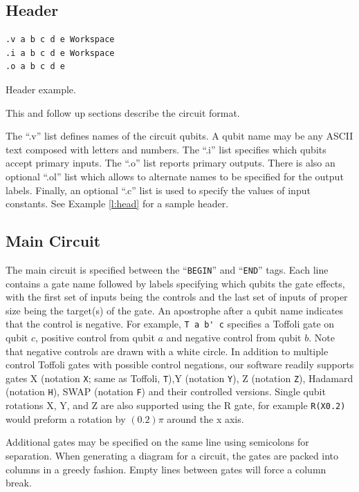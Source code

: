 \documentclass[aps,prl,reprint,floatfix,superscriptaddress]{revtex4-1} %
\begin{document}
\subsection{Header}
\begin{program}
\begin{verbatim}
.v a b c d e Workspace
.i a b c d e Workspace
.o a b c d e
\end{verbatim}
\caption{Header example.}
\label{l:head}
\end{program}
This and follow up sections describe the circuit format. 

The ``.v'' list defines names of the circuit qubits. A qubit name may be any ASCII text composed with letters and numbers. The ``.i'' list specifies which %
qubits accept primary inputs.
The ``.o'' list reports primary outputs.
There is also an optional ``.ol'' list which allows to alternate names to be specified for the output labels. Finally, an optional ``.c'' list is used to %
specify the values of input constants. See Example \ref{l:head} for a sample header.

\subsection{Main Circuit}
The main circuit is specified between the ``\verb+BEGIN+'' and ``\verb+END+'' tags.  Each line contains a gate name followed by labels
specifying which qubits the gate effects, with the first set of inputs being the controls
and the last set of inputs of proper size being the target(s) of the gate.
An apostrophe after a qubit name indicates that the control is negative. For example, \verb+T a b' c+ specifies a Toffoli gate on
qubit $c$, positive control from qubit $a$ and negative control from qubit $b$. Note that negative controls are drawn with a white circle.
In addition to multiple control Toffoli gates with possible control negations, our software readily supports gates X 
(notation \verb+X+; same as Toffoli, \verb+T+),Y (notation \verb+Y+), Z (notation \verb+Z+), Hadamard (notation \verb+H+), 
SWAP (notation \verb+F+) and their controlled versions. 
Single qubit rotations X, Y, and Z are also supported using the R gate, for example 
\verb+R(X0.2)+ would preform a rotation by $(0.2)\pi$ around the x axis. 

Additional gates may be specified on the same line using semicolons for separation. When generating a diagram for a circuit, 
the gates are packed into columns in a greedy fashion. Empty lines between gates will force a column break.
\end{document}
